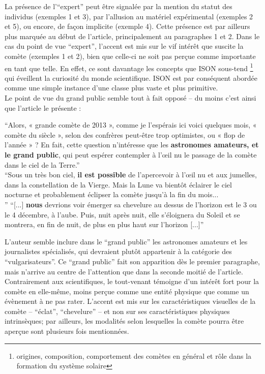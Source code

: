 \documentclass[a4paper,10pt]{article}
\begin{document}
			La présence de l'``expert'' peut être signalée par la mention du statut des individus (exemples 1 et 3), par l'allusion au matériel expérimental (exemples 2 et 5), ou encore, de façon implicite (exemple 4). Cette présence est par ailleurs plus marquée au début de l'article, principalement au paragraphes 1 et 2. Dans le cas du point de vue ``expert'', l'accent est mis sur le vif intérêt que suscite la comète (exemples 1 et 2), bien que celle-ci ne soit pas perçue comme importante en tant que telle. En effet, ce sont davantage les concepts que ISON sous-tend \footnote{origines, composition, comportement des comètes en général et rôle dans la formation du système solaire} qui éveillent la curiosité du monde scientifique. ISON est par conséquent abordée comme une simple instance d'une classe plus vaste et plus primitive.\\
			
			Le point de vue du grand public semble tout à fait opposé -- du moins c'est ainsi que l'article le présente :
			\begin{center}
				\footnotesize
				\begin{minipage}{0.7\textwidth}
					 ``Alors, « grande comète de 2013 », comme je l'espérais ici voici quelques mois, « comète du siècle », selon des confrères peut-être trop optimistes, ou « flop de l'année » ? En fait, cette question n'intéresse que les \textbf{astronomes amateurs, et le grand public}, qui peut espérer contempler à l’œil nu le passage de la comète dans le ciel de la Terre.''\\
					 ``Sous un très bon ciel, \textbf{il est possible} de l'apercevoir à l’œil nu et aux jumelles, dans la constellation de la Vierge. Mais la Lune va bientôt éclairer le ciel nocturne et probablement éclipser la comète jusqu'à la fin du mois...\\''
					 ``[...] \textbf{nous} devrions voir émerger sa chevelure au dessus de l'horizon est le 3 ou le 4 décembre, à l'aube. Puis, nuit après nuit, elle s'éloignera du Soleil et se montrera, en fin de nuit, de plus en plus haut sur l'horizon [...]''
				\end{minipage}
			\end{center}
			L'auteur semble inclure dans le ``grand public'' les astronomes amateurs et les journalistes spécialisés, qui devraient plutôt appartenir à la catégorie des ``vulgarisateurs''. Ce ``grand public'' fait son apparition dès le premier paragraphe, mais n'arrive au centre de l'attention que dans la seconde moitié de l'article. Contrairement aux scientifiques, le tout-venant témoigne d'un intérêt fort pour la comète en elle-même, moins perçue comme une entité physique que comme un évènement à ne pas rater. L'accent est mis sur les caractéristiques visuelles de la comète  -- ``éclat'', ``chevelure'' --  et non sur ses caractéristiques physiques intrinsèques; par ailleurs, les modalités selon lesquelles la comète pourra être aperçue sont plusieurs fois mentionnées.
\end{document}
